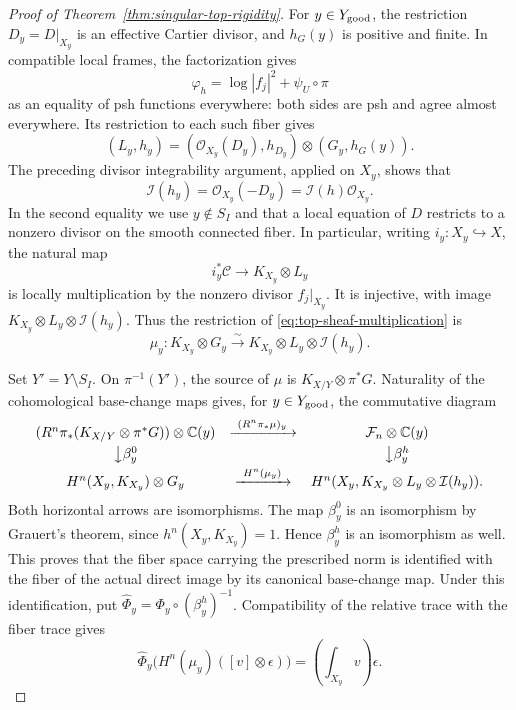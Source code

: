 \documentclass[11pt,reqno]{amsart}
\numberwithin{equation}{section}
\theoremstyle{definition}
\theoremstyle{remark}
\begin{document}
\begin{proof}[Proof of Theorem~\ref{thm:singular-top-rigidity}]
For $y\in Y_{\rm good}$, the restriction $D_y=D|_{X_y}$ is an
effective Cartier divisor, and $h_G(y)$ is positive and finite.
In compatible local frames, the factorization gives
\[
 \varphi_h=\log|f_j|^2+\psi_U\circ\pi
\]
as an equality of psh functions everywhere: both sides are psh and
agree almost everywhere.  Its restriction to each such fiber gives
\[
 (L_y,h_y)=(\mathcal O_{X_y}(D_y),h_{D_y})\otimes(G_y,h_G(y)).
\]
The preceding divisor integrability argument, applied on $X_y$,
shows that
\begin{equation}\label{eq:top-good-fiber-ideal}
 \mathcal I(h_y)=\mathcal O_{X_y}(-D_y)
               =\mathcal I(h)\mathcal O_{X_y}.
\end{equation}
In the second equality we use $y\notin S_I$ and that a local equation
of $D$ restricts to a nonzero divisor on the smooth connected fiber.
In particular, writing $i_y:X_y\hookrightarrow X$, the natural map
\[
 i_y^*\mathcal C\longrightarrow K_{X_y}\otimes L_y
\]
is locally multiplication by the nonzero divisor $f_j|_{X_y}$.
It is injective, with image
$K_{X_y}\otimes L_y\otimes\mathcal I(h_y)$.
Thus the restriction of \eqref{eq:top-sheaf-multiplication} is
\[
 \mu_y:K_{X_y}\otimes G_y\xrightarrow{\ \sim\ }
 K_{X_y}\otimes L_y\otimes\mathcal I(h_y).
\]

Set $Y'=Y\setminus S_I$.  On $\pi^{-1}(Y')$, the source of $\mu$
is $K_{X/Y}\otimes\pi^*G$.  Naturality of the cohomological
base-change maps gives, for $y\in Y_{\rm good}$, the commutative diagram
\[
 \begin{array}{ccc}
 (R^n\pi_*(K_{X/Y}\otimes\pi^*G))\otimes\mathbb C(y)
 &\xrightarrow{\ (R^n\pi_*\mu)_y\ }&\mathcal F_n\otimes\mathbb C(y)\\[3pt]
 \big\downarrow\beta_y^0&&\big\downarrow\beta_y^h\\[3pt]
 H^n(X_y,K_{X_y})\otimes G_y
 &\xrightarrow{\ H^n(\mu_y)\ }&
 H^n(X_y,K_{X_y}\otimes L_y\otimes\mathcal I(h_y)).
 \end{array}
\]
Both horizontal arrows are isomorphisms.  The map $\beta_y^0$ is
an isomorphism by Grauert's theorem, since
$h^n(X_y,K_{X_y})=1$.  Hence $\beta_y^h$ is an isomorphism as well.
This proves that the fiber space carrying the prescribed norm is
identified with the fiber of the actual direct image by its
canonical base-change map.  Under this identification,
put $\widehat\Phi_y=\Phi_y\circ(\beta_y^h)^{-1}$.  Compatibility
of the relative trace with the fiber trace gives
\begin{equation}\label{eq:top-fiber-trace-identification}
 \widehat\Phi_y\bigl(H^n(\mu_y)([v]\otimes\epsilon)\bigr)
       =\left(\int_{X_y}v\right)\epsilon.
\end{equation}


\end{proof}
\end{document}
